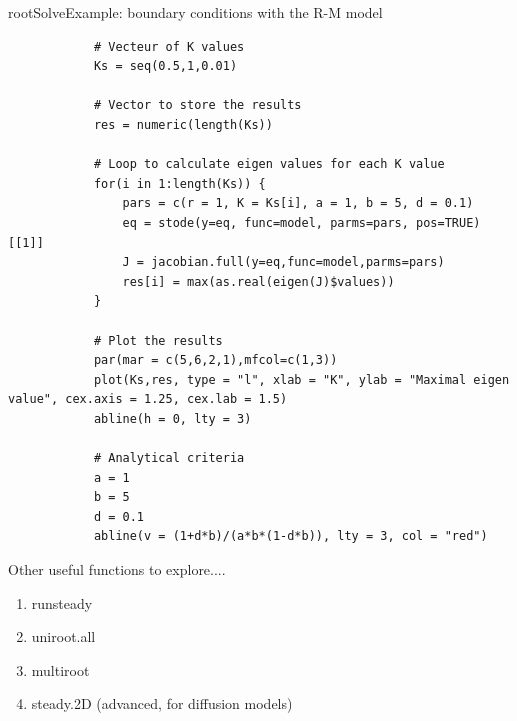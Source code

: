\documentclass{eecslides}
\begin{document}
	\begin{frame}[fragile]{rootSolve}{Example: boundary conditions with the R-M model}

		\begin{lstlisting}
			# Vecteur of K values
			Ks = seq(0.5,1,0.01)

			# Vector to store the results
			res = numeric(length(Ks))

			# Loop to calculate eigen values for each K value
			for(i in 1:length(Ks)) {	
				pars = c(r = 1, K = Ks[i], a = 1, b = 5, d = 0.1)
				eq = stode(y=eq, func=model, parms=pars, pos=TRUE)[[1]]
				J = jacobian.full(y=eq,func=model,parms=pars)
				res[i] = max(as.real(eigen(J)$values))
			}
	
			# Plot the results
			par(mar = c(5,6,2,1),mfcol=c(1,3))
			plot(Ks,res, type = "l", xlab = "K", ylab = "Maximal eigen value", cex.axis = 1.25, cex.lab = 1.5)
			abline(h = 0, lty = 3)

			# Analytical criteria
			a = 1
			b = 5
			d = 0.1
			abline(v = (1+d*b)/(a*b*(1-d*b)), lty = 3, col = "red")
		\end{lstlisting}

	\end{frame}


	\begin{frame}{Other useful functions to explore....}

		\begin{enumerate}
			\item runsteady
			\item uniroot.all
			\item multiroot
			\item steady.2D (advanced, for diffusion models)
		\end{enumerate}
	\end{frame}

\end{document}

